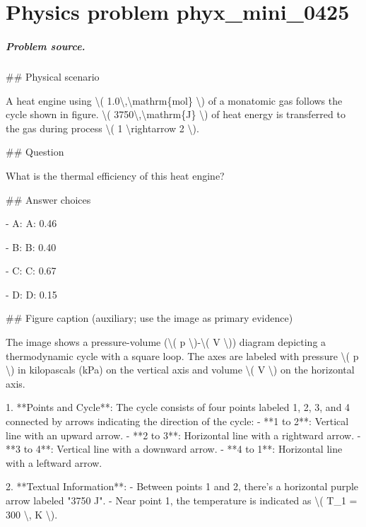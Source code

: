 
\chapter{Physics problem phyx\_mini\_0425}
\label{ch:PhyXMiniProblems_problem_phyx_mini_0425}

\paragraph{Problem source.}
\#\# Physical scenario

A heat engine using \textbackslash{}( 1.0\textbackslash{},\textbackslash{}mathrm\{mol\} \textbackslash{}) of a monatomic gas follows the cycle shown in figure. \textbackslash{}( 3750\textbackslash{},\textbackslash{}mathrm\{J\} \textbackslash{}) of heat energy is transferred to the gas during process \textbackslash{}( 1 \textbackslash{}rightarrow 2 \textbackslash{}).

\#\# Question

What is the thermal efficiency of this heat engine?

\#\# Answer choices

- A: A: 0.46

- B: B: 0.40

- C: C: 0.67

- D: D: 0.15

\#\# Figure caption (auxiliary; use the image as primary evidence)

The image shows a pressure-volume (\textbackslash{}( p \textbackslash{})-\textbackslash{}( V \textbackslash{})) diagram depicting a thermodynamic cycle with a square loop. The axes are labeled with pressure \textbackslash{}( p \textbackslash{}) in kilopascals (kPa) on the vertical axis and volume \textbackslash{}( V \textbackslash{}) on the horizontal axis.

1. **Points and Cycle**: The cycle consists of four points labeled 1, 2, 3, and 4 connected by arrows indicating the direction of the cycle:
   - **1 to 2**: Vertical line with an upward arrow.
   - **2 to 3**: Horizontal line with a rightward arrow.
   - **3 to 4**: Vertical line with a downward arrow.
   - **4 to 1**: Horizontal line with a leftward arrow.

2. **Textual Information**:
   - Between points 1 and 2, there's a horizontal purple arrow labeled "3750 J".
   - Near point 1, the temperature is indicated as \textbackslash{}( T\_1 = 300 \textbackslash{}, K \textbackslash{}).

